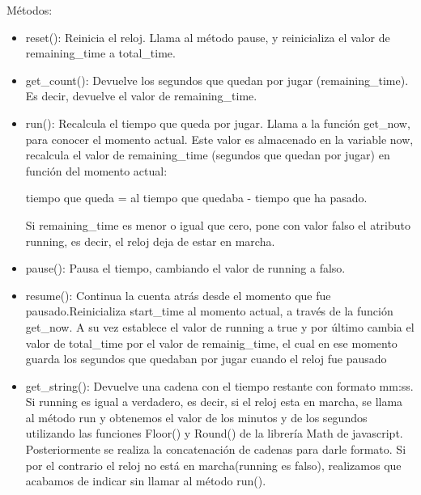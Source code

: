 Métodos:

\begin{itemize}
 \item reset(): Reinicia el reloj. Llama al método pause, y reinicializa el valor de remaining\_time a total\_time.

 \item get\_count(): Devuelve los segundos que quedan por jugar (remaining\_time). Es decir, devuelve el valor de remaining\_time.

 \item run(): Recalcula el tiempo que queda por jugar. Llama a la función get\_now, para conocer el momento actual. Este valor es 
 almacenado en la variable now, recalcula el valor de remaining\_time (segundos que quedan por jugar) en función del momento actual:

        tiempo que queda = al tiempo que quedaba - tiempo que ha pasado.
        
Si remaining\_time es menor o igual que cero, pone con valor falso el atributo running, es decir, el reloj deja de estar en marcha.

 \item pause(): Pausa el tiempo, cambiando el valor de running a falso.

 \item resume(): Continua la cuenta atrás desde el momento que fue pausado.Reinicializa start\_time al momento actual, a través de 
 la función get\_now. A su vez establece el valor de running a true y por último cambia el valor de total\_time por el valor de 
 remainig\_time, el cual en ese momento guarda los segundos que quedaban por jugar cuando el reloj fue pausado

 \item get\_string(): Devuelve una cadena con el tiempo restante con formato mm:ss. Si running es igual a verdadero, es decir, 
 si el reloj esta en marcha, se llama al método run y obtenemos el valor de los minutos y de los segundos utilizando las 
 funciones Floor() y Round() de la librería Math de javascript. Posteriormente se realiza la concatenación de cadenas para 
darle formato. Si por el contrario el reloj no está en marcha(running es falso), realizamos que acabamos de indicar sin 
llamar al método run().
\end{itemize}

